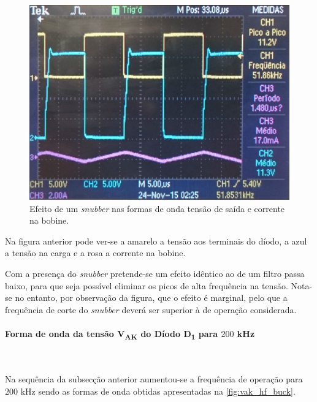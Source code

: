 \documentclass[a4paper,11pt]{article}
\numberwithin{equation}{section}
\begin{document}
\begin{figure}[H]
	\centering
	\includegraphics[keepaspectratio=true, scale=0.175]{img/figs/snubber_buck}
	\caption{Efeito de um \textit{snubber} nas formas de onda tensão de saída e corrente na bobine.}
	\label{fig:snubber_buck}
	\vspace{-0.8em}
\end{figure}

Na figura anterior pode ver-se a amarelo a tensão aos terminais do díodo, a azul a tensão na carga e a rosa a corrente na bobine.

Com a presença do \textit{snubber} pretende-se um efeito idêntico ao de um filtro passa baixo, para que seja possível eliminar os picos de alta frequência na tensão. Nota-se no entanto, por observação da figura, que o efeito é marginal, pelo que a frequência de corte do \textit{snubber} deverá ser superior à de operação considerada.

\paragraph{Forma de onda da tensão V\textsubscript{AK} do Díodo D\textsubscript{1} para $200$ kHz}\mbox{}\

Na sequência da subsecção anterior aumentou-se a frequência de operação para $200$ kHz sendo as formas de onda obtidas apresentadas na \autoref{fig:vak_hf_buck}.
\end{document}
